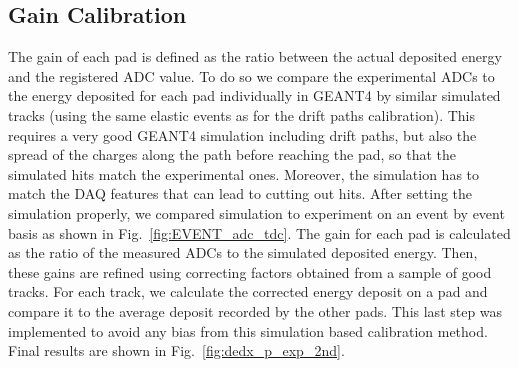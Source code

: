 \documentclass[preprint,5p]{elsarticle}
\begin{document}
\subsection{Gain Calibration}

The gain of each pad is defined as the ratio between the actual 
deposited energy and the registered ADC value. 
To do so we compare the experimental ADCs to the energy deposited 
for each pad individually in GEANT4 by similar simulated tracks (using the 
same elastic events as for the drift 
paths calibration). This requires a very good GEANT4 simulation 
including drift paths, but also the spread of the charges along the path
before reaching the pad, so that the simulated hits match the experimental 
ones. Moreover, the simulation has to match the DAQ features 
that can lead to cutting out hits. After setting the simulation properly, we 
compared simulation to experiment on an event by event basis as shown in 
Fig.~\ref{fig:EVENT_adc_tdc}. The gain for each pad is calculated 
as the ratio of the measured ADCs to the simulated deposited energy.  
Then, these gains are refined using correcting factors obtained from a 
sample of good tracks. For each track, we calculate the corrected 
energy deposit on a pad and compare it to the average
deposit recorded by the other pads. This last step was implemented to 
avoid any bias from this simulation based calibration method.
Final results are shown in Fig.~\ref{fig:dedx_p_exp_2nd}.
\end{document}
